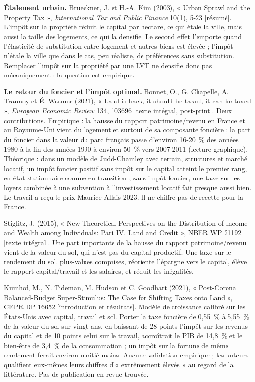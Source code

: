 \documentclass[11pt,a4paper]{article}
\newcommand{\lu}[1]{{\footnotesize\color{ocre}[#1]}}
\begin{document}
\textbf{Étalement urbain.} Brueckner, J. et H.-A. Kim (2003), « Urban Sprawl and the Property
Tax », \emph{International Tax and Public Finance} 10(1), 5-23 \lu{résumé}. L'impôt sur la
propriété réduit le capital par hectare, ce qui étale la ville, mais aussi la taille des
logements, ce qui la densifie. Le second effet l'emporte quand l'élasticité de substitution entre
logement et autres biens est élevée ; l'impôt n'étale la ville que dans le cas, peu réaliste, de
préférences sans substitution. Remplacer l'impôt sur la propriété par une LVT ne densifie donc pas
mécaniquement : la question est empirique.

\textbf{Le retour du foncier et l'impôt optimal.} Bonnet, O., G. Chapelle, A. Trannoy et
É. Wasmer (2021), « Land is back, it should be taxed, it can be taxed », \emph{European Economic
Review} 134, 103696 \lu{texte intégral, post-print}. Deux contributions. Empirique : la hausse du
rapport patrimoine/revenu en France et au Royaume-Uni vient du logement et surtout de sa
composante foncière ; la part du foncier dans la valeur du parc français passe d'environ
16-20~\% des années 1980 à la fin des années 1990 à environ 50~\% vers 2007-2011 (lecture
graphique). Théorique : dans un modèle de Judd-Chamley avec terrain, structures et marché
locatif, un impôt foncier positif sans impôt sur le capital atteint le premier rang, en état
stationnaire comme en transition ; sans impôt foncier, une taxe sur les loyers combinée à une
subvention à l'investissement locatif fait presque aussi bien. Le travail a reçu le prix Maurice
Allais 2023. Il ne chiffre pas de recette pour la France.

Stiglitz, J. (2015), « New Theoretical Perspectives on the Distribution of Income and Wealth among
Individuals: Part IV. Land and Credit », NBER WP 21192 \lu{texte intégral}. Une part importante de
la hausse du rapport patrimoine/revenu vient de la valeur du sol, qui n'est pas du capital
productif. Une taxe sur le rendement du sol, plus-values comprises, réoriente l'épargne vers le
capital, élève le rapport capital/travail et les salaires, et réduit les inégalités.

Kumhof, M., N. Tideman, M. Hudson et C. Goodhart (2021), « Post-Corona Balanced-Budget
Super-Stimulus: The Case for Shifting Taxes onto Land », CEPR DP 16652 \lu{introduction et
résultats}. Modèle de croissance calibré sur les États-Unis avec capital, travail et sol. Porter
la taxe foncière de 0,55~\% à 5,55~\% de la valeur du sol sur vingt ans, en baissant de 28 points
l'impôt sur les revenus du capital et de 10 points celui sur le travail, accroîtrait le PIB de
14,8~\% et le bien-être de 3,4~\% de la consommation ; un impôt sur la fortune de même rendement
ferait environ moitié moins. Aucune validation empirique ; les auteurs qualifient eux-mêmes leurs
chiffres d'« extrêmement élevés » au regard de la littérature. Pas de publication en revue
trouvée.
\end{document}
